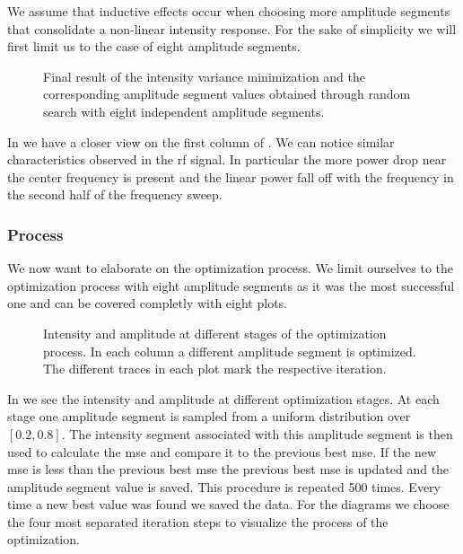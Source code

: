 We assume that inductive effects occur when choosing more amplitude segments
that consolidate a non-linear intensity response. For the sake of simplicity
we will first limit us to the case of eight amplitude segments.
\begin{figure}[htb]
  \centering
  \begin{adjustbox}{width=\textwidth}
  \end{adjustbox}
  \caption{Final result of the intensity variance minimization and the
    corresponding amplitude segment values obtained through random search with
    eight independent amplitude segments.
  }\label{fig:intensity_optimization_intensity_amplitude}
\end{figure}
In  we have a closer
view on the first column of . We
can notice similar characteristics observed in the \gls{rf} signal. In
particular the more power drop near the center frequency is present and the
linear power fall off with the frequency in the second half of the frequency
sweep.

\subsubsection{Process}

We now want to elaborate on the optimization process. We limit ourselves to
the optimization process with eight amplitude segments as it was the most
successful one and can be covered completly with eight plots.
\begin{figure}[htb]
  \centering
  \begin{adjustbox}{width=\textwidth}
  \end{adjustbox}
  \caption{Intensity and amplitude at different stages of the optimization
    process. In each column a different amplitude segment is optimized.
    The different traces in each plot mark the respective iteration.
  }\label{fig:intensity_optimization_process}
\end{figure}
In  we see the intensity and
amplitude at different optimization stages. At each stage one amplitude
segment is sampled from a uniform distribution over $[0.2,0.8]$. The intensity
segment associated with this amplitude segment is then used to calculate
the \gls{mse} and compare it to the previous best \gls{mse}. If the new
\gls{mse} is less than the previous best \gls{mse} the previous best \gls{mse}
is updated and the amplitude segment value is saved. This procedure is
repeated 500 times. Every time a new best value was found we saved the
data. For the diagrams we choose the four most separated iteration steps to
visualize the process of the optimization.

